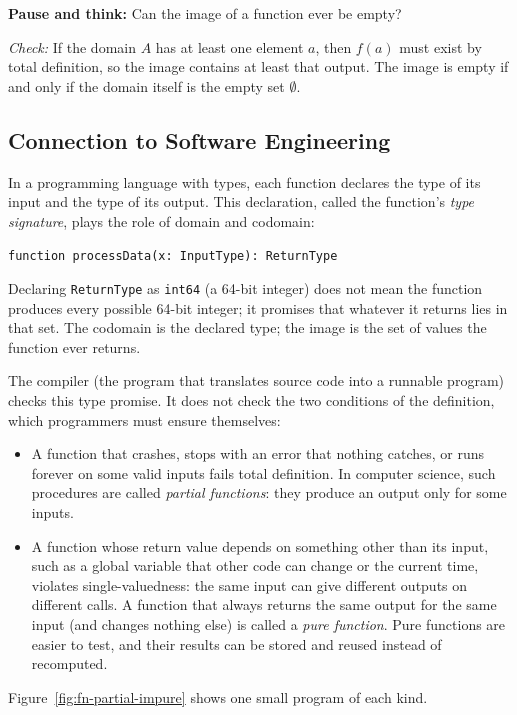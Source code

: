 \begin{recoverybox}
\textbf{Pause and think:} Can the image of a function ever be empty?

\emph{Check:} If the domain $A$ has at least one element $a$, then $f(a)$ must exist by total definition, so the image contains at least that output. The image is empty if and only if the domain itself is the empty set $\emptyset$.
\end{recoverybox}

\subsection{Connection to Software Engineering}

In a programming language with types, each function declares the type of its input and the type of its output. This declaration, called the function's \emph{type signature}, plays the role of domain and codomain:
\begin{center}
\texttt{function processData(x: InputType): ReturnType}
\end{center}
Declaring \texttt{ReturnType} as \texttt{int64} (a 64-bit integer) does not mean the function produces every possible 64-bit integer; it promises that whatever it returns lies in that set. The codomain is the declared type; the image is the set of values the function ever returns.

The compiler (the program that translates source code into a runnable program) checks this type promise. It does not check the two conditions of the definition, which programmers must ensure themselves:
\begin{itemize}
\item A function that crashes, stops with an error that nothing catches, or runs forever on some valid inputs fails total definition. In computer science, such procedures are called \emph{partial functions}: they produce an output only for some inputs.
\item A function whose return value depends on something other than its input, such as a global variable that other code can change or the current time, violates single-valuedness: the same input can give different outputs on different calls. A function that always returns the same output for the same input (and changes nothing else) is called a \emph{pure function}. Pure functions are easier to test, and their results can be stored and reused instead of recomputed.
\end{itemize}
Figure~\ref{fig:fn-partial-impure} shows one small program of each kind.

